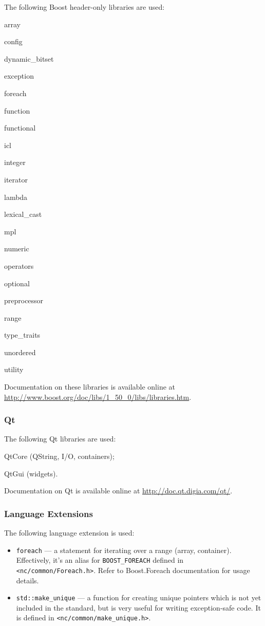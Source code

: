 \documentclass[a4paper,12pt]{article}
\newcommand{\ident}[1]{\texttt{#1}}
\begin{document}
The following Boost header-only libraries are used:
\begin{itemize*}
\item array
\item config
\item dynamic\_bitset
\item exception
\item foreach
\item function
\item functional
\item icl
\item integer
\item iterator
\item lambda
\item lexical\_cast
\item mpl
\item numeric
\item operators
\item optional
\item preprocessor
\item range
\item type\_traits
\item unordered
\item utility
\end{itemize*}

Documentation on these libraries is available online at \url{http://www.boost.org/doc/libs/1_50_0/libs/libraries.htm}.

\subsubsection{Qt}

The following Qt libraries are used:
\begin{itemize*}
\item QtCore (QString, I/O, containers);
\item QtGui (widgets).
\end{itemize*}

Documentation on Qt is available online at \url{http://doc.qt.digia.com/qt/}.

\subsubsection{Language Extensions}

The following language extension is used:

\begin{itemize}
\item \ident{foreach} --- a statement for iterating over a range (array, container).
Effectively, it's an alias for \ident{BOOST\_FOREACH} defined in \verb|<nc/common/Foreach.h>|.
Refer to Boost.Foreach documentation for usage details.
\item \ident{std::make\_unique} --- a function for creating unique pointers which is not yet included in the standard, but is very useful for writing exception-safe code.
It is defined in \verb|<nc/common/make_unique.h>|.
\end{itemize}
\end{document}
